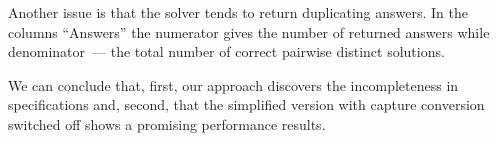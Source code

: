     Another issue is that the solver tends to return duplicating answers. In the columns ``Answers'' the numerator gives the number of
    returned answers while denominator~--- the total number of correct pairwise distinct solutions.

    We can conclude that, first, our approach discovers the incompleteness in specifications and, second, that the simplified version
    with capture conversion switched off shows a promising performance results.
    
    

